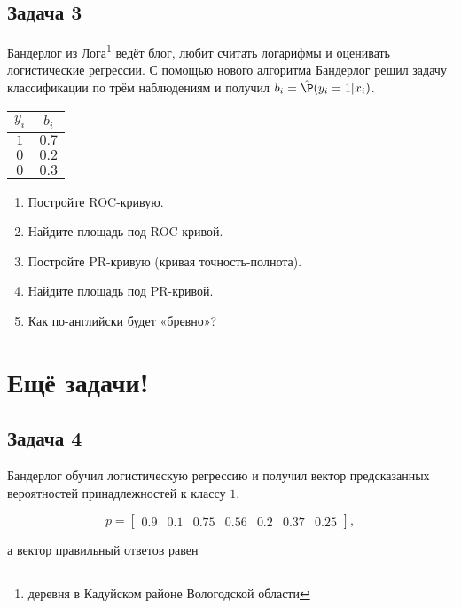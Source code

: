 \documentclass[12pt, a4paper, oneside]{article}
\begin{document}
\subsection*{Задача 3}

	Бандерлог из Лога\footnote{деревня в Кадуйском районе Вологодской области} ведёт блог, любит считать логарифмы и оценивать логистические регрессии. С помощью нового алгоритма Бандерлог решил задачу классификации по трём наблюдениям и получил $b_i = \hat\P(y_i = 1|x_i)$.
	
\begin{center}
	\begin{tabular}{c|c}
		$y_i$ & $b_i$ \\
		\hline
		$1$  & $0.7$ \\
		$0$ & $0.2$ \\
		$0$ & $0.3$ \\
	\end{tabular}
\end{center}
	
	\begin{enumerate}
		\item Постройте ROC-кривую.
		\item Найдите площадь под ROC-кривой.
		\item Постройте PR-кривую (кривая точность-полнота).
		\item Найдите площадь под PR-кривой.
		\item Как по-английски будет «бревно»?
	\end{enumerate}



\section{Ещё задачи!}

\subsection*{Задача 4}

Бандерлог обучил логистическую регрессию и получил вектор предсказанных вероятностей принадлежностей к классу $1$. 

$$p = \begin{bmatrix} 0.9 & 0.1 & 0.75 &  0.56 &  0.2 &  0.37 & 0.25 \end{bmatrix},$$

а вектор правильный ответов равен
\end{document}
